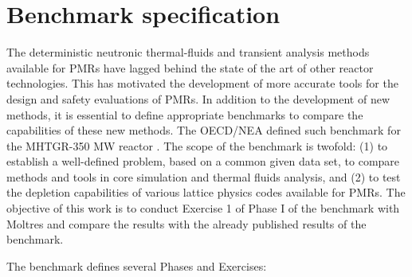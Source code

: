 \documentclass[11pt,letterpaper]{article}
\begin{document}

\section{Benchmark specification}

The deterministic neutronic thermal-fluids and transient analysis methods available for \glspl{PMR} have lagged behind the state of the art of other reactor technologies.
This has motivated the development of more accurate tools for the design and safety evaluations of \glspl{PMR}.
In addition to the development of new methods, it is essential to define appropriate benchmarks to compare the capabilities of these new methods.
The \gls{OECD}/\gls{NEA} defined such benchmark for the \gls{MHTGR}-350 MW reactor \cite{oecd_nea_benchmark_2017}.
The scope of the benchmark is twofold: (1) to establish a well-defined problem, based on a common given data set, to compare methods and tools in core simulation and thermal fluids analysis, and (2) to test the depletion capabilities of various lattice physics codes available for \glspl{PMR}.
The objective of this work is to conduct Exercise 1 of Phase I of the benchmark with Moltres and compare the results with the already published results of the benchmark\cite{oecd_nea_coupled_2019}.


The benchmark defines several Phases and Exercises:
\end{document}
